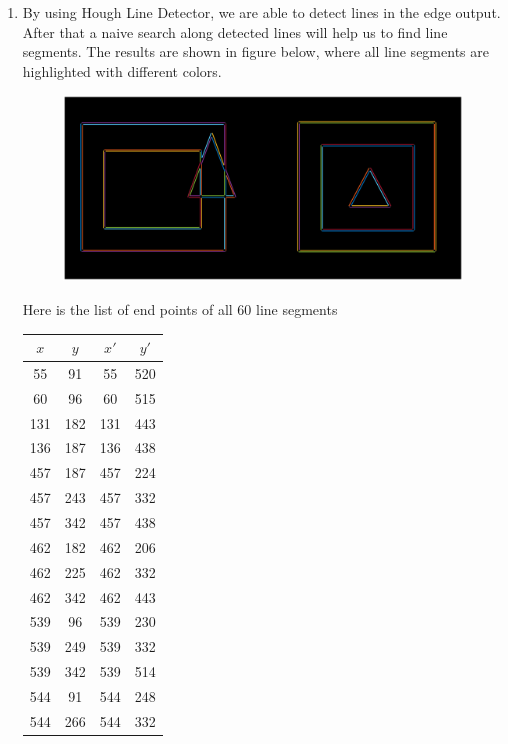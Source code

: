 \documentclass[12pt]{article}
\begin{document}
\begin{enumerate}
\begin{enumerate}
	\item By using Hough Line Detector, we are able to detect lines in the edge output. After that a naive search along detected lines will help us to find line segments. The results are shown in figure below, where all line segments are highlighted with different colors.
	\begin{figure}[H]
		\centering
		\includegraphics[width=\textwidth]{q4e.eps}
		\vspace{-4em}
	\end{figure} 
	Here is the list of end points of all 60 line segments 
		\begin{longtable}{|c|c|c|c|}
			\hline
			$x$  & $y$ & $x'$ & $y'$ \\ \hline
			55   & 91  & 55   & 520  \\ \hline
			60   & 96  & 60   & 515  \\ \hline
			131  & 182 & 131  & 443  \\ \hline
			136  & 187 & 136  & 438  \\ \hline
			457  & 187 & 457  & 224  \\ \hline
			457  & 243 & 457  & 332  \\ \hline
			457  & 342 & 457  & 438  \\ \hline
			462  & 182 & 462  & 206  \\ \hline
			462  & 225 & 462  & 332  \\ \hline
			462  & 342 & 462  & 443  \\ \hline
			539  & 96  & 539  & 230  \\ \hline
			539  & 249 & 539  & 332  \\ \hline
			539  & 342 & 539  & 514  \\ \hline
			544  & 91  & 544  & 248  \\ \hline
			544  & 266 & 544  & 332  \\ \hline

\end{longtable}
\end{enumerate}
\end{enumerate}
\end{document}
